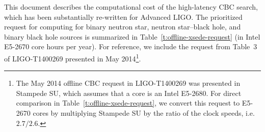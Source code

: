 This document describes the computational cost of the high-latency CBC search,
which has been substantially re-written for Advanced LIGO. The prioritized request for computing 
for binary neutron star, neutron star--black hole,
and binary black hole sources is summarized in
Table~\ref{t:offline-xsede-request} (in Intel\textsuperscript{\textregistered} E5-2670 core
hours per year). For reference, we include the request from Table~3 of
LIGO-T1400269 presented in May 2014\footnote{The May 2014 offline CBC request
in LIGO-T1400269
was presented in Stampede SU, which assumes that a core is an Intel\textsuperscript{\textregistered} E5-2680.  For
direct comparison in Table~\ref{t:offline-xsede-request}, we convert this
request to E5-2670 cores by multiplying Stampede SU by the ratio of the clock
speeds, i.e. $2.7/2.6$.}.



